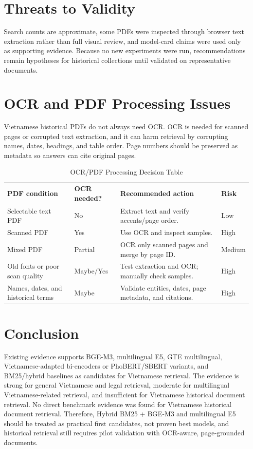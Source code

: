 \documentclass[11pt]{article}
\begin{document}
\section{Threats to Validity}
Search counts are approximate, some PDFs were inspected through browser text extraction rather than full visual review, and model-card claims were used only as supporting evidence. Because no new experiments were run, recommendations remain hypotheses for historical collections until validated on representative documents.

\section{OCR and PDF Processing Issues}
Vietnamese historical PDFs do not always need OCR. OCR is needed for scanned pages or corrupted text extraction, and it can harm retrieval by corrupting names, dates, headings, and table order. Page numbers should be preserved as metadata so answers can cite original pages.

\begin{table}[H]
\centering
\caption{OCR/PDF Processing Decision Table}
\label{tab:ocr}
\small
\begin{tabularx}{\textwidth}{p{}p{}Y p{0.14\textwidth}}
\toprule
PDF condition & OCR needed? & Recommended action & Risk \\
\midrule
Selectable text PDF & No & Extract text and verify accents/page order. & Low \\
Scanned PDF & Yes & Use OCR and inspect samples. & High \\
Mixed PDF & Partial & OCR only scanned pages and merge by page ID. & Medium \\
Old fonts or poor scan quality & Maybe/Yes & Test extraction and OCR; manually check samples. & High \\
Names, dates, and historical terms & Maybe & Validate entities, dates, page metadata, and citations. & High \\
\bottomrule
\end{tabularx}
\end{table}

\section{Conclusion}
Existing evidence supports BGE-M3, multilingual E5, GTE multilingual, Vietnamese-adapted bi-encoders or PhoBERT/SBERT variants, and BM25/hybrid baselines as candidates for Vietnamese retrieval. The evidence is strong for general Vietnamese and legal retrieval, moderate for multilingual Vietnamese-related retrieval, and insufficient for Vietnamese historical document retrieval. No direct benchmark evidence was found for Vietnamese historical document retrieval. Therefore, Hybrid BM25 + BGE-M3 and multilingual E5 should be treated as practical first candidates, not proven best models, and historical retrieval still requires pilot validation with OCR-aware, page-grounded documents.



\end{document}
